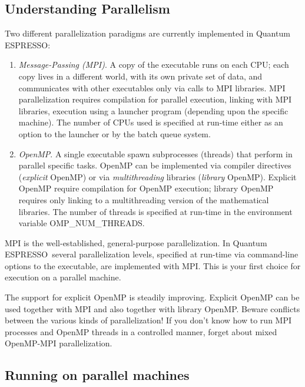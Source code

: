\documentclass[12pt,a4paper]{article}
\def\qe{{\sc Quantum ESPRESSO}}
\begin{document}
\subsection{Understanding Parallelism}

Two different parallelization paradigms are currently implemented
in \qe:
\begin{enumerate}
\item {\em Message-Passing (MPI)}. A copy of the executable runs
on each CPU; each copy lives in a different world, with its own
private set of data, and communicates with other executables only
via calls to MPI libraries. MPI parallelization requires compilation
for parallel execution, linking with MPI libraries, execution using
a launcher program (depending upon the specific machine). The number
of CPUs used
is specified at run-time either as an option to the launcher or
by the batch queue system.
\item {\em OpenMP}.  A single executable spawn subprocesses
(threads) that perform in parallel specific tasks.
OpenMP can be implemented via compiler directives ({\em explicit}
OpenMP) or via {\em multithreading} libraries  ({\em library} OpenMP).
Explicit OpenMP require compilation for OpenMP execution;
library OpenMP requires only linking to a multithreading
version of the mathematical libraries.
The number of threads is specified at run-time in the environment
variable OMP\_NUM\_THREADS.
\end{enumerate}

MPI is the well-established, general-purpose parallelization.
In \qe\ several parallelization levels, specified at run-time
via command-line options to the executable, are implemented
with MPI. This is your first choice for execution on a parallel
machine.

The support for explicit OpenMP is steadily improving.
Explicit OpenMP can be used together with MPI and also
together with library OpenMP. Beware
conflicts between the various kinds of parallelization!
If you don't know how to run MPI processes
and OpenMP threads in a controlled manner, forget about mixed
OpenMP-MPI parallelization.

\subsection{Running on parallel machines}
\end{document}
